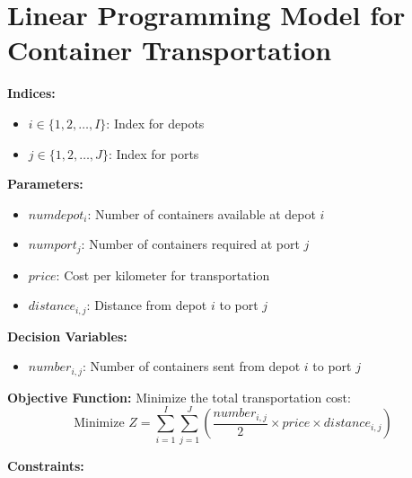 \documentclass{article}
\begin{document}
\section*{Linear Programming Model for Container Transportation}

\textbf{Indices:}
\begin{itemize}
    \item $i \in \{1, 2, \ldots, I\}$: Index for depots
    \item $j \in \{1, 2, \ldots, J\}$: Index for ports
\end{itemize}

\textbf{Parameters:}
\begin{itemize}
    \item $numdepot_i$: Number of containers available at depot $i$
    \item $numport_j$: Number of containers required at port $j$
    \item $price$: Cost per kilometer for transportation
    \item $distance_{i,j}$: Distance from depot $i$ to port $j$
\end{itemize}

\textbf{Decision Variables:}
\begin{itemize}
    \item $number_{i,j}$: Number of containers sent from depot $i$ to port $j$
\end{itemize}

\textbf{Objective Function:}
Minimize the total transportation cost:
\[
\text{Minimize } Z = \sum_{i=1}^{I} \sum_{j=1}^{J} \left( \frac{number_{i,j}}{2} \times price \times distance_{i,j} \right)
\]

\textbf{Constraints:}
\end{document}
